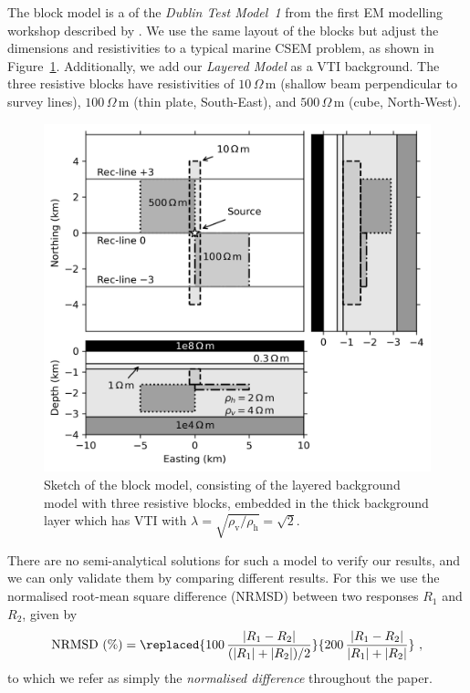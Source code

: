 \documentclass[extra, camera,%
]{gji}
\newcommand{\mr}[1]{\mathrm{#1}}
\newcommand{\ohmm}{\ensuremath{\Omega\,}\text{m}\xspace}
\begin{document}
The block model is a  of the  \emph{Dublin Test Model~1} from the first EM modelling workshop described by \cite{GJI.13.Miensopust}. We use the same layout of the blocks but adjust the dimensions and resistivities to a typical marine CSEM problem, as shown in Figure~\ref{fig:model-block}. Additionally, we add our \emph{Layered Model} as a VTI background. The three resistive blocks have resistivities of \deleted{$\rho=$}$10\,\ohmm$ (shallow beam perpendicular to survey lines), \deleted{$\rho=$}$100\,\ohmm$ (thin plate, South-East), and \deleted{$\rho=$}$500\,\ohmm$ (cube, North-West).
%
\begin{figure}
  \centering
  \includegraphics[width=\linewidth]{figures/model-block.png}
  \caption{Sketch of the block model, consisting of the layered background model with three resistive blocks, embedded in the thick background layer which has VTI with $\lambda=\sqrt{\rho_\textrm{v}/\rho_\textrm{h}}=\sqrt{2}$.}
  \label{fig:model-block}
\end{figure}
%

There are no semi-analytical solutions for such a model to verify our results, and we can only validate them by comparing different results. For this we use the normalised root-mean square difference (NRMSD) between two responses $R_1$ and $R_2$, given by
%
\begin{equation}
  \mr{NRMSD~(\%)} = \replaced{100\,\frac{|R_1 - R_2|}{(|R_1| + |R_2|)/2}}
                             {200\,\frac{|R_1 - R_2|}{|R_1| + |R_2|}}\ ,
  \label{eq:nrmsd}
\end{equation}
%
to which we refer as simply the \emph{normalised difference} throughout the paper.
\end{document}
